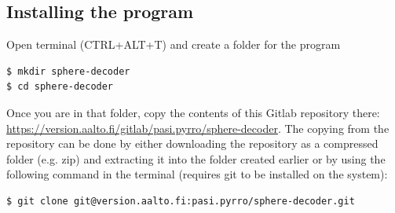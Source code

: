 \documentclass[english,12pt,a4paper,pdftex,sci,utf8]{aaltothesis}
\begin{document}
\subsection{Installing the program}

Open terminal (CTRL+ALT+T) and create a folder for the program 
\begin{verbatim}
$ mkdir sphere-decoder
$ cd sphere-decoder
\end{verbatim}Once you are in that folder, copy the contents of this Gitlab repository there: \url{https://version.aalto.fi/gitlab/pasi.pyrro/sphere-decoder}. %
The copying from the repository can be done by either downloading the repository as a compressed folder (e.g. zip) and extracting it into the folder created earlier or by using the following command in the terminal (requires git to be installed on the system):
\begin{verbatim}
$ git clone git@version.aalto.fi:pasi.pyrro/sphere-decoder.git
\end{verbatim}
\end{document}
